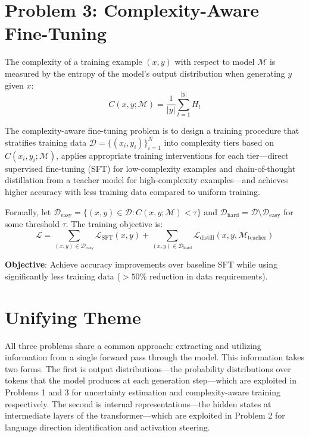 \section{Problem 3: Complexity-Aware Fine-Tuning}

\begin{Def}
The complexity of a training example $(x, y)$ with respect to model $\mathcal{M}$ is measured by the entropy of the model's output distribution when generating $y$ given $x$:
\begin{equation}
    C(x, y; \mathcal{M}) = \frac{1}{|y|} \sum_{t=1}^{|y|} H_t
    \label{eq:complexity}
\end{equation}
\end{Def}

The complexity-aware fine-tuning problem is to design a training procedure that stratifies training data $\mathcal{D} = \{(x_i, y_i)\}_{i=1}^N$ into complexity tiers based on $C(x_i, y_i; \mathcal{M})$, applies appropriate training interventions for each tier---direct supervised fine-tuning (SFT) for low-complexity examples and chain-of-thought distillation from a teacher model for high-complexity examples---and achieves higher accuracy with less training data compared to uniform training.

Formally, let $\mathcal{D}_{\text{easy}} = \{(x, y) \in \mathcal{D} : C(x, y; \mathcal{M}) < \tau\}$ and $\mathcal{D}_{\text{hard}} = \mathcal{D} \setminus \mathcal{D}_{\text{easy}}$ for some threshold $\tau$. The training objective is:
\begin{equation}
    \mathcal{L} = \sum_{(x,y) \in \mathcal{D}_{\text{easy}}} \mathcal{L}_{\text{SFT}}(x, y) + \sum_{(x,y) \in \mathcal{D}_{\text{hard}}} \mathcal{L}_{\text{distill}}(x, y, \mathcal{M}_{\text{teacher}})
    \label{eq:training_objective}
\end{equation}

\textbf{Objective}: Achieve accuracy improvements over baseline SFT while using significantly less training data ($>50\%$ reduction in data requirements).

\section{Unifying Theme}

All three problems share a common approach: extracting and utilizing information from a single forward pass through the model. This information takes two forms. The first is output distributions---the probability distributions over tokens that the model produces at each generation step---which are exploited in Problems 1 and 3 for uncertainty estimation and complexity-aware training respectively. The second is internal representations---the hidden states at intermediate layers of the transformer---which are exploited in Problem 2 for language direction identification and activation steering.

